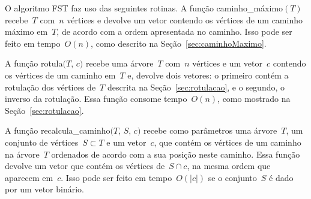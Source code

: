 		O algoritmo FST faz uso das seguintes rotinas.
		A função {\sc caminho\_máximo}$(T)$ 
		recebe~$T$ com~$n$ vértices e
		devolve um vetor contendo os vértices de um caminho 
		máximo em~$T$, de acordo com a ordem apresentada no caminho.
		Isso pode ser feito em tempo~$O(n)$, como descrito na 
		Seção~\ref{sec:caminhoMaximo}.

		A função {\sc rotula}$(T$, $c)$ recebe uma árvore~$T$ com~$n$ vértices 
		e um vetor~$c$
		contendo os vértices de um caminho em~$T$ e,
		devolve dois vetores: o primeiro contém a rotulação dos vértices 
		de~$T$
		descrita na Seção~\ref{sec:rotulacao}, e o segundo, o inverso
		da rotulação. 
		Essa função consome tempo~$O(n)$, como mostrado na 
		Seção~\ref{sec:rotulacao}.

		A função {\sc recalcula\_caminho}$(T$, $S$, $c)$
		recebe como parâmetros uma árvore~$T$, um conjunto de vértices~$S\subset T$ 
		e um vetor~$c$, que contém os vértices de um caminho na árvore~$T$ ordenados
		de acordo com a sua posição neste caminho.
		Essa função devolve um vetor que contém os vértices de~$S\cap c$, na mesma 
		ordem que aparecem em~$c$. 
		Isso pode ser feito em tempo~$O(|c|)$ se 
		o conjunto~$S$ é dado por um vetor binário.





